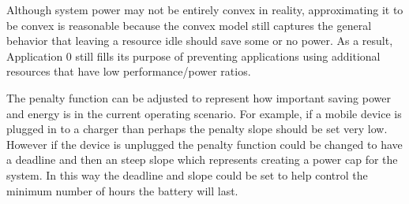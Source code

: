 Although system power may not be entirely convex in reality, approximating it to be convex is reasonable because the convex model still captures the general behavior that leaving a resource idle should save some or no power.  As a result, Application 0 still fills its purpose of preventing applications using additional resources that have low performance/power ratios.  

The penalty function can be adjusted to represent how important saving power and energy is in the current operating scenario.  For example, if a mobile device is plugged in to a charger than perhaps the penalty slope should be set very low.  However if the device is unplugged the penalty function could be changed to have a deadline and then an steep slope which represents creating a power cap for the system.  In this way the deadline and slope could be set to help control the minimum number of hours the battery will last.

